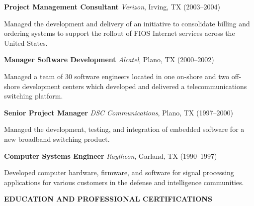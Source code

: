 \documentclass{article}
\newcommand{\sbt}{\,\begin{picture}(-1,1)(-1,-3)\circle*{3}\end{picture}\ }
\newenvironment{tightcenter}{%
  \setlength\topsep{0pt}
  \setlength\parskip{10pt}
  \begin{center}
}{%
  \end{center}
}
\begin{document}
\smallskip

\noindent
{\bfseries Project Management Consultant} {\itshape Verizon}, Irving, TX (2003--2004)

\begin{compactitem}

\item[\sbt] Managed the development and delivery of an initiative to consolidate billing and ordering systems to support the rollout of FIOS Internet services across the United States.

\end{compactitem}

\smallskip

\noindent
{\bfseries Manager Software Development} {\itshape Alcatel}, Plano, TX (2000--2002)

\begin{compactitem}

\item[\sbt] Managed a team of 30 software engineers located in one on-shore and two off-shore development centers which developed and delivered a telecommunications switching platform.

\end{compactitem}

\smallskip

\noindent
{\bfseries Senior Project Manager} {\itshape DSC Communications}, Plano, TX (1997--2000)

\begin{compactitem}

\item[\sbt] Managed the development, testing, and integration of embedded software for a new broadband switching product.

\end{compactitem}

\smallskip

\noindent
{\bfseries Computer Systems Engineer} {\itshape Raytheon}, Garland, TX (1990--1997)

\begin{compactitem}

\item[\sbt] Developed computer hardware, firmware, and software for signal processing applications for various customers in the defense and intelligence communities.

\end{compactitem}

\clearpage

\begin{tightcenter}
{\bfseries \large EDUCATION AND PROFESSIONAL CERTIFICATIONS}
\end{tightcenter}
\end{document}
